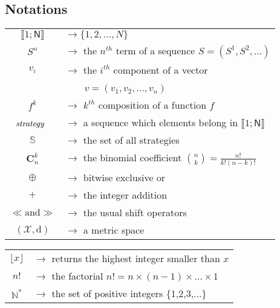 \documentclass[10pt, a4paper, conference, compsocconf]{IEEEtran}
\begin{document}
\subsection{Notations}
\begin{tabular}{@{}c@{}@{}l@{}}
$\llbracket 1;\mathsf{N} \rrbracket$ & $\rightarrow\{1,2,\hdots,N\}$ \\
$S^{n}$ & $\rightarrow$ the $n^{th}$ term of a sequence $S=(S^{1},S^{2},\hdots)$ \\
$v_{i}$ & $\rightarrow$ the $i^{th}$ component of a vector \\
        &~~~~$v=(v_{1},v_{2},\hdots, v_n)$\\
$f^{k}$ & $\rightarrow$ $k^{th}$ composition of a function $f$ \\
$\emph{strategy}$~ & $\rightarrow$ a sequence which elements belong in $\llbracket 1;\mathsf{N} \rrbracket $ \\
$\mathbb{S}$ & $\rightarrow$ the set of all strategies \\
$\mathbf{C}_n^k$ & $\rightarrow$ the binomial coefficient ${n \choose k} = \frac{n!}{k!(n-k)!}$\\
$\oplus$ & $\rightarrow$ bitwise exclusive or \\
$+$ & $\rightarrow$ the integer addition \\
$\ll \text{and} \gg$ & $\rightarrow$ the usual shift operators \\
$(\mathcal{X}, \text{d})$ & $\rightarrow$ a metric space  \\
\end{tabular}

\begin{tabular}{@{}c@{}@{}l@{}}




$\lfloor x \rfloor$ & $\rightarrow$ returns the highest integer smaller than $x$  \\
$n!$ & $\rightarrow$ the factorial $n!=n\times(n-1)\times\dots\times1$\\
$\mathds{N}^{\ast }$ & $\rightarrow$ the set of positive integers \{1,2,3,...\}
\end{tabular}
\end{document}
